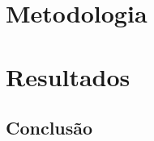 \documentclass[
	12pt,				%
	openright,			%
	twoside,			%
	a4paper,			%
	english,			%
	french,				%
	spanish,			%
	brazil,				%
	]{abntex2}
\begin{document}
\tableofcontents*
\cleardoublepage


\textual






\part{Metodologia}







\part{Resultados}








\chapter{Conclusão}



\postextual




%
%


\begin{apendicesenv}

\partapendices





\end{apendicesenv}
\end{document}
